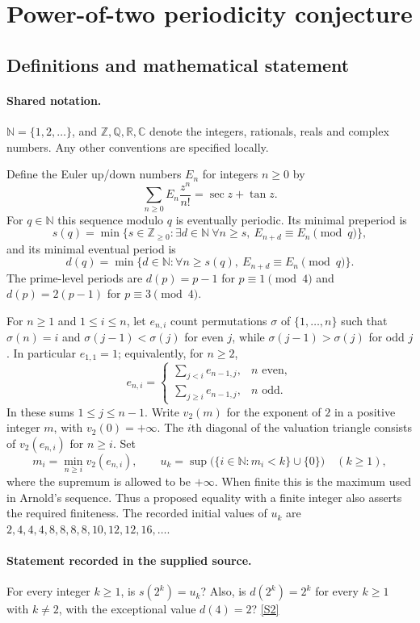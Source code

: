\documentclass[11pt]{article}
\newcommand{\sref}[2]{\hyperlink{source:#1:#2}{[S#2]}}
\begin{document}
\section{Power-of-two periodicity conjecture}\label{statement}

\subsection{Definitions and mathematical statement}

\paragraph{Shared notation.}$\mathbb N=\{1,2,\ldots\}$, and $\mathbb Z,\mathbb Q,\mathbb R,\mathbb C$ denote the integers, rationals, reals and complex numbers. Any other conventions are specified locally.


Define the Euler up/down numbers $E_n$ for integers $n\ge0$ by
\[
\sum_{n\ge0} E_n\frac{z^n}{n!}=\sec z+\tan z.
\]
For $q\in\mathbb N$ this sequence modulo $q$ is eventually periodic. Its minimal preperiod is
\[
s(q)=\min\{s\in\mathbb Z_{\ge0}:\exists d\in\mathbb N\ \forall n\ge s,\ E_{n+d}\equiv E_n\pmod q\},
\]
and its minimal eventual period is
\[
d(q)=\min\{d\in\mathbb N:\forall n\ge s(q),\ E_{n+d}\equiv E_n\pmod q\}.
\]
The prime-level periods are $d(p)=p-1$ for $p\equiv1\pmod4$ and $d(p)=2(p-1)$ for $p\equiv3\pmod4$.

For $n\ge1$ and $1\le i\le n$, let $e_{n,i}$ count permutations $\sigma$ of $\{1,\ldots,n\}$ such that $\sigma(n)=i$ and $\sigma(j-1)<\sigma(j)$ for even $j$, while $\sigma(j-1)>\sigma(j)$ for odd $j$. In particular $e_{1,1}=1$; equivalently, for $n\ge2$,
\[
e_{n,i}=\begin{cases}\sum_{j<i}e_{n-1,j},&n\text{ even},\\\sum_{j\ge i}e_{n-1,j},&n\text{ odd}.\end{cases}
\]
In these sums $1\le j\le n-1$. Write $v_2(m)$ for the exponent of $2$ in a positive integer $m$, with $v_2(0)=+\infty$. The $i$th diagonal of the valuation triangle consists of $v_2(e_{n,i})$ for $n\ge i$. Set
\[
m_i=\min_{n\ge i}v_2(e_{n,i}),\qquad
u_k=\sup\bigl(\{i\in\mathbb N:m_i<k\}\cup\{0\}\bigr)\quad(k\ge1),
\]
where the supremum is allowed to be $+\infty$. When finite this is the maximum used in Arnold's sequence. Thus a proposed equality with a finite integer also asserts the required finiteness. The recorded initial values of $u_k$ are $2,4,4,4,8,8,8,8,10,12,12,16,\ldots$.
\paragraph{Statement recorded in the supplied source.}
For every integer $k\ge1$, is $s(2^k)=u_k$? Also, is $d(2^k)=2^k$ for every $k\ge1$ with $k\ne2$, with the exceptional value $d(4)=2$? \sref{statement}{2}
\end{document}
